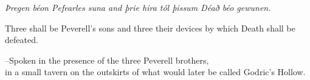 \later

\begin{center}
\emph{Þregen béon Pefearles suna and þrie hira tól þissum Déað béo gewunen.}

Three shall be Peverell's sons and three their devices by which Death shall be defeated.

\---Spoken in the presence of the three Peverell brothers,\\
in a small tavern on the outskirts of what would later be called Godric's Hollow.
\end{center}

